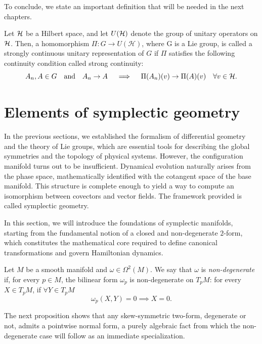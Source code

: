 \noindent To conclude, we state an important definition that will be needed in the next chapters.

\begin{definition} \label{def:rep-scur}
	Let $\H$ be a Hilbert space, and let $U(\H)$ denote the group of unitary operators on $\H$. Then, a homomorphism $\Pi \colon G \to U(\mathcal{H})$, where G is a Lie group, is called a strongly continuous unitary representation of $G$ if $\Pi$ satisfies the following continuity condition called strong continuity: 
	\[
 		A_n, A \in G \quad \text{and} \quad  A_n \to A \quad \implies \quad \Pi(A_n) (v) \to \Pi(A) (v) \quad \forall v \in \H.
 	\] 
\end{definition}

\section{Elements of symplectic geometry}

In the previous sections, we established the formalism of differential geometry and the theory of Lie groups, which are essential tools for describing the global symmetries and the topology of physical systems. However, the configuration manifold turns out to be insufficient. Dynamical evolution naturally arises from the phase space, mathematically identified with the cotangent space of the base manifold. This structure is complete enough to yield a way to compute an isomorphism between covectors and vector fields. The framework provided is called symplectic geometry. 

In this section, we will introduce the foundations of symplectic manifolds, starting from the fundamental notion of a closed and non-degenerate $2$-form, which constitutes the mathematical core required to define canonical transformations and govern Hamiltonian dynamics.

\begin{definition}\label{def:non-deg}
	Let $M$ be a smooth manifold and $\omega \in \Omega^2(M)$. We say that $\omega$ is \emph{non-degenerate} if, for every $p \in M$, the bilinear form $\omega_p$ is non-degenerate on $T_pM$: for every $X \in T_pM$, if $\forall Y \in T_pM$ 
	\[
		\omega_p(X,Y) = 0 \implies X = 0.
	\]
\end{definition}

The next proposition shows that any skew-symmetric two-form, degenerate or not, admits a pointwise normal form, a purely algebraic fact from which the non-degenerate case will follow as an immediate specialization.

